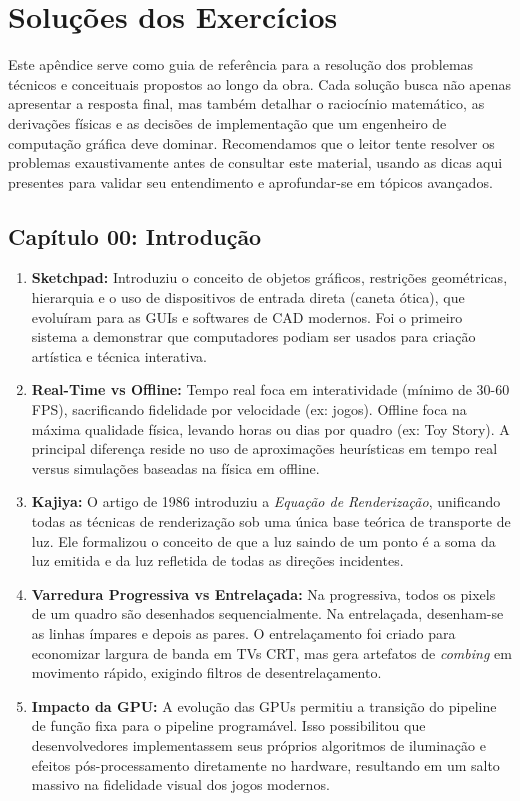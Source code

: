 \chapter{Soluções dos Exercícios}

Este apêndice serve como guia de referência para a resolução dos problemas técnicos e conceituais propostos ao longo da obra. Cada solução busca não apenas apresentar a resposta final, mas também detalhar o raciocínio matemático, as derivações físicas e as decisões de implementação que um engenheiro de computação gráfica deve dominar. Recomendamos que o leitor tente resolver os problemas exaustivamente antes de consultar este material, usando as dicas aqui presentes para validar seu entendimento e aprofundar-se em tópicos avançados.

\section*{Capítulo 00: Introdução}
\begin{enumerate}
    \item \textbf{Sketchpad:} Introduziu o conceito de objetos gráficos, restrições geométricas, hierarquia e o uso de dispositivos de entrada direta (caneta ótica), que evoluíram para as GUIs e softwares de CAD modernos. Foi o primeiro sistema a demonstrar que computadores podiam ser usados para criação artística e técnica interativa.
    \item \textbf{Real-Time vs Offline:} Tempo real foca em interatividade (mínimo de 30-60 FPS), sacrificando fidelidade por velocidade (ex: jogos). Offline foca na máxima qualidade física, levando horas ou dias por quadro (ex: Toy Story). A principal diferença reside no uso de aproximações heurísticas em tempo real versus simulações baseadas na física em offline.
    \item \textbf{Kajiya:} O artigo de 1986 introduziu a \textit{Equação de Renderização}, unificando todas as técnicas de renderização sob uma única base teórica de transporte de luz. Ele formalizou o conceito de que a luz saindo de um ponto é a soma da luz emitida e da luz refletida de todas as direções incidentes.
    \item \textbf{Varredura Progressiva vs Entrelaçada:} Na progressiva, todos os pixels de um quadro são desenhados sequencialmente. Na entrelaçada, desenham-se as linhas ímpares e depois as pares. O entrelaçamento foi criado para economizar largura de banda em TVs CRT, mas gera artefatos de \textit{combing} em movimento rápido, exigindo filtros de desentrelaçamento.
    \item \textbf{Impacto da GPU:} A evolução das GPUs permitiu a transição do pipeline de função fixa para o pipeline programável. Isso possibilitou que desenvolvedores implementassem seus próprios algoritmos de iluminação e efeitos pós-processamento diretamente no hardware, resultando em um salto massivo na fidelidade visual dos jogos modernos.
\end{enumerate}

